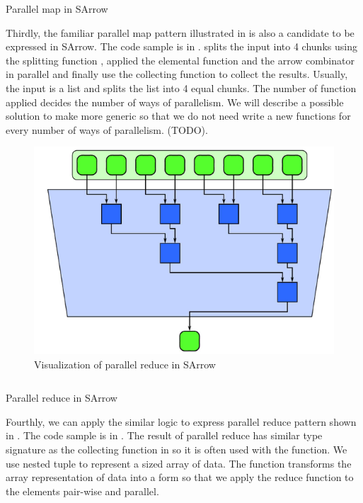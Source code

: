\begin{listing}[ht]
    \inputminted{Haskell}{arrow/pmap.hs}
    \caption{Parallel map in SArrow}
    \label{arrow:code:pmap}
\end{listing}
Thirdly, the familiar parallel map pattern illustrated in  is also a candidate to be expressed in SArrow. The code sample is in .  splits the input  into 4 chunks using the splitting function , applied the elemental function  and the arrow combinator \hask{***} in parallel and finally use the collecting function  to collect the results. Usually, the input  is a list and  splits the list into 4 equal chunks. The number of function  applied decides the number of ways of parallelism. We will describe a possible solution to make  more generic so that we do not need write a new functions for every number of ways of parallelism. (TODO).

\begin{figure}[ht]
    \centering 
    \includegraphics{arrow/preduc.png}
    \caption{Visualization of parallel reduce in SArrow \cite{mccoolStructuredParallelPrograming2012}}
    \label{arrow:fig:preduc}
\end{figure}
\begin{listing}[ht]
    \inputminted{Haskell}{arrow/preduc.hs} 
    \caption{Parallel reduce in SArrow}
    \label{arrow:code:preduc}
\end{listing}
Fourthly, we can apply the similar logic to express parallel reduce pattern shown in . The code sample is in . The result of parallel reduce has similar type signature as the collecting function in  so it is often used with the  function. We use nested tuple  to represent a sized array of data. The  function transforms the array representation of data into a form so that we apply the reduce function  to the elements pair-wise and parallel.

